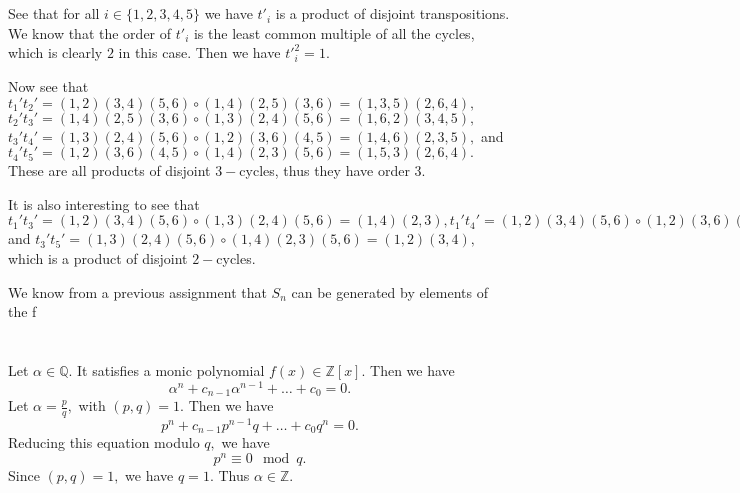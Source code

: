 \documentclass{article}
\title{} %
\author{Gandhar Kulkarni (mmat2304)} %
\date{} %
\begin{document}
 
\maketitle %


\section{} %
\section{} %
See that for all $i \in \{1,2,3,4,5\}$ we have $t'_i$ is a product of disjoint transpositions. We know that the order of $t'_i$ is the least common multiple 
of all the cycles, which is clearly $2$ in this case. Then we have ${t'}_i^2=1.$

Now see that $t_1't_2'= (1 ,2)(3 ,4)(5 ,6)\circ (1 ,4)(2, 5)(3, 6)=(1 ,3 ,5)(2, 6 ,4),$ $t_2't_3'=(1 ,4)(2, 5)(3, 6) \circ (1, 3)(2, 4)(5, 6)=(1, 6 ,2)(3, 
4, 5),$
$t_3't_4'= (1, 3)(2 ,4)(5 ,6) \circ (1, 2) (3, 6) (4, 5)=(1 ,4 ,6)(2, 3 ,5),$ and $t_4' t_5'= (1, 2) (3, 6) (4, 5) \circ (1, 4)(2, 3)(5, 6)=(1 ,5, 3)(2, 6, 
4).$ These are all 
products of disjoint $3-$cycles, thus they have order $3.$ 

It is also interesting to see that $t_1't_3'=(1 ,2)(3, 4)(5, 6)\circ (1, 3)(2, 4)(5 ,6)=(1 ,4)(2 ,3), t_1't_4'=(1 ,2)(3, 4)(5, 6)\circ (1 ,2) (3, 6) (4 ,5)= 
(3, 5 )(4 ,6), 
t_1't_5'=(1 ,2)(3, 4)(5, 6)\circ (1 ,4)(2, 3)(5, 6)= (1, 3)(2, 4), t_2't_4'=(1, 4)(2 ,5)(3, 6) \circ (1, 2) (3, 6) (4 ,5)=(1, 5)(2, 4), t_2't_5'=(1, 4)(2, 
5)(3, 6) \circ (1, 
4)(2, 3)(5 ,6)= (2 ,6)(3, 5),$ and $t_3't_5'= (1 ,3)(2, 4)(5, 6) \circ  (1 ,4)(2, 3)(5, 6)=(1 ,2)(3, 4),$ which is a product of disjoint $2-$cycles. 

We know from a previous assignment that $S_n$ can be generated by elements of the f
\section{} %
Let $\alpha \in \mathbb{Q}.$ It satisfies a monic polynomial $f(x) \in \mathbb{Z}[x].$ Then we have $$\alpha^n + c_{n-1}\alpha^{n-1} + \dots + c_0=0.$$
Let $\alpha=\frac{p}{q},$ with $(p,q)=1.$ Then we have $$p^n + c_{n-1}p^{n-1}q + \dots + c_0q^n=0.$$ Reducing this equation modulo $q,$ we have 
$$p^n \equiv 0 \mod q.$$ Since $(p,q)=1,$ we have $q=1.$ Thus $\alpha \in \mathbb{Z}.$
\end{document}
